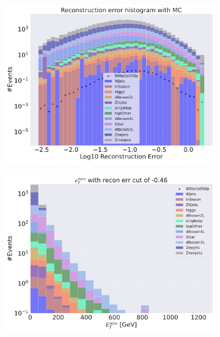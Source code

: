 \begin{figure}[H]
    \centering
    \begin{subfigure}{.49\textwidth}
        \includegraphics[width=\textwidth]{Figures/VAE_testing/small/3lep/b_data_recon_big_rm3_feats_sig_800p0p050p.pdf}
        \caption{ }
        \label{fig:VAE_3lep_small_800_3}
    \end{subfigure}
    \hfill
    \begin{subfigure}{.49\textwidth}
        \includegraphics[width=\textwidth]{Figures/VAE_testing/small/3lep/b_data_recon_big_rm3_feats_sig_800p0p050p_etmiss_recon_errcut_-0.46.pdf}
        \caption{}
        \label{fig:VAE_3lep_small_etmiss_800_3}
    \end{subfigure}

\end{figure}
